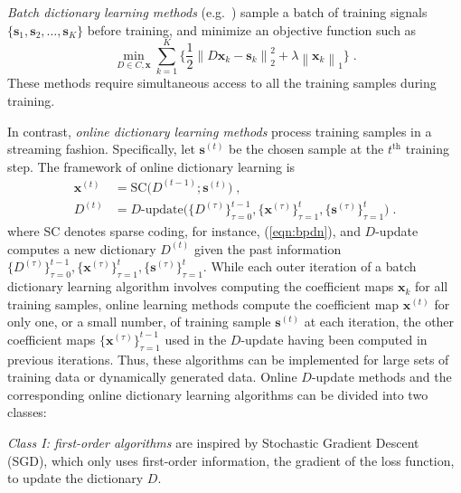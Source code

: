 \documentclass[final]{siamart1116}
\newcommand{\mb}[1]{\mathbf{#1}}
\providecommand{\norm}[1]{\left\lVert#1\right\rVert}
\begin{document}
\emph{Batch dictionary learning methods} (e.g.~\cite{engan1999frame, engan1999method, aharon2006rm, xu-2016-fast}) sample a batch of training signals $\{\mb{s}_1, \mb{s}_2, \ldots, \mb{s}_K\}$ before training, and minimize an objective function such as
\begin{equation}
\label{eqn:batch-dl}
\min_{D\in C, \mb{x}} \sum_{k=1}^K \bigg\{ \frac{1}{2}\norm{D\mb{x}_k -\mb{s}_k}_2^2 + \lambda \norm{\mb{x}_k}_1\bigg\} \;.
\end{equation}
These methods require simultaneous access to all the training samples during training.

In contrast, \emph{online dictionary learning methods} process training samples in a streaming fashion. Specifically, let $\mb{s}^{(t)}$ be the chosen sample at the $t^{\text{th}}$ training step. The framework of online dictionary learning is
\begin{equation}
\label{eqn:online-dl}
\begin{split}
\mb{x}^{(t)} &= \text{SC} \Big(D^{(t-1)}; \mb{s}^{(t)}\Big) \;,\\
D^{(t)} &= D\text{-update} \bigg(\{D^{(\tau)}\}_{\tau=0}^{t-1}, \{\mb{x}^{(\tau)}\}_{\tau=1}^{t}, \{\mb{s}^{(\tau)}\}_{\tau=1}^{t}\bigg) \;.
\end{split}
\end{equation}
where SC denotes sparse coding, for instance, (\ref{eqn:bpdn}), and $D$-update computes a new dictionary $D^{(t)}$ given the past information $\{D^{(\tau)}\}_{\tau=0}^{t-1}, \{\mb{x}^{(\tau)}\}_{\tau=1}^{t}, \{\mb{s}^{(\tau)}\}_{\tau=1}^{t}$.  While each outer iteration of a batch dictionary learning algorithm involves computing the coefficient maps $\mb{x}_k$ for all training samples, online learning methods compute the coefficient map $\mb{x}^{(t)}$ for only one, or a small number, of training sample $\mb{s}^{(t)}$ at each iteration, the other coefficient maps $\{\mb{x}^{(\tau)}\}_{\tau=1}^{t-1}$ used in the $D$-update having been computed in previous iterations. Thus, these algorithms can be implemented for large sets of training data or dynamically generated data. Online $D$-update methods and the corresponding online dictionary learning algorithms can be divided into two classes:

\emph{Class I: first-order algorithms} \cite{wang2010locality, mairal2012task, aharon2008sparse} are inspired by Stochastic Gradient Descent (SGD), which only uses first-order information, the gradient of the loss function, to update the dictionary $D$.
\end{document}

